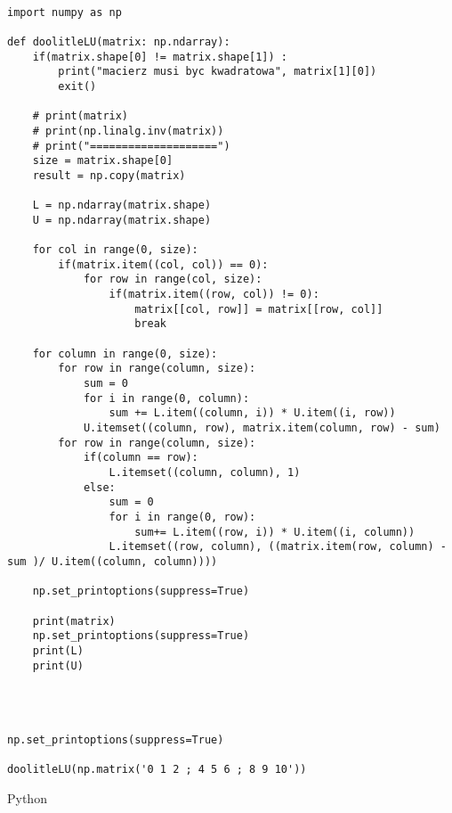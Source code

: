 \begin{verbatim}

import numpy as np 

def doolitleLU(matrix: np.ndarray):
    if(matrix.shape[0] != matrix.shape[1]) :
        print("macierz musi byc kwadratowa", matrix[1][0])
        exit()

    # print(matrix)
    # print(np.linalg.inv(matrix))
    # print("====================")
    size = matrix.shape[0]
    result = np.copy(matrix)

    L = np.ndarray(matrix.shape)
    U = np.ndarray(matrix.shape)

    for col in range(0, size):
        if(matrix.item((col, col)) == 0):
            for row in range(col, size):
                if(matrix.item((row, col)) != 0):
                    matrix[[col, row]] = matrix[[row, col]]
                    break

    for column in range(0, size):
        for row in range(column, size):
            sum = 0
            for i in range(0, column):
                sum += L.item((column, i)) * U.item((i, row))
            U.itemset((column, row), matrix.item(column, row) - sum)    
        for row in range(column, size):
            if(column == row):
                L.itemset((column, column), 1)
            else:
                sum = 0
                for i in range(0, row):
                    sum+= L.item((row, i)) * U.item((i, column))
                L.itemset((row, column), ((matrix.item(row, column) - sum )/ U.item((column, column))))    
    
    np.set_printoptions(suppress=True)

    print(matrix)
    np.set_printoptions(suppress=True)
    print(L)
    print(U)




np.set_printoptions(suppress=True)

doolitleLU(np.matrix('0 1 2 ; 4 5 6 ; 8 9 10'))  
\end{verbatim}{Python}
